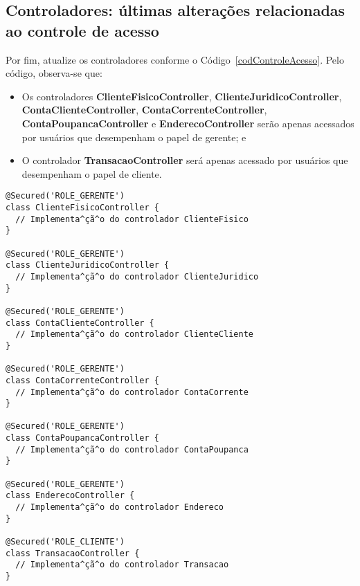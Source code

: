 \subsection{Controladores: últimas alterações relacionadas ao controle de acesso}

\vspace{0.3cm}

Por  fim, atualize os  controladores conforme  o Código~\ref{codControleAcesso}.
Pelo código, observa-se que: 

\vspace{0.3cm}

\begin{itemize}

\item      Os     controladores     {\bf      ClienteFisicoController},     {\bf
  ClienteJuridicoController},       {\bf      ContaClienteController},      {\bf
  ContaCorrenteController},     {\bf     ContaPoupancaController}     e     {\bf
  EnderecoController}  serão apenas  acessados  por usuários  que desempenham  o
  papel de gerente; e 

\vspace{0.3cm}

\item O controlador {\bf  TransacaoController} será apenas acessado por usuários
  que desempenham o papel de cliente.

\end{itemize}

\begin{lstlisting}[caption=Controladores  - últimas  alterações  relacionadas ao
    Controle de Acesso, frame = trBL,float=htbp, label=codControleAcesso] 
@Secured('ROLE_GERENTE')
class ClienteFisicoController {
  // Implementa^çã^o do controlador ClienteFisico
}

@Secured('ROLE_GERENTE')
class ClienteJuridicoController {
  // Implementa^çã^o do controlador ClienteJuridico
}

@Secured('ROLE_GERENTE')
class ContaClienteController {
  // Implementa^çã^o do controlador ClienteCliente
}

@Secured('ROLE_GERENTE')
class ContaCorrenteController {
  // Implementa^çã^o do controlador ContaCorrente
}

@Secured('ROLE_GERENTE')
class ContaPoupancaController {
  // Implementa^çã^o do controlador ContaPoupanca
}

@Secured('ROLE_GERENTE')
class EnderecoController {
  // Implementa^çã^o do controlador Endereco
}

@Secured('ROLE_CLIENTE')
class TransacaoController {
  // Implementa^çã^o do controlador Transacao
}
\end{lstlisting}

